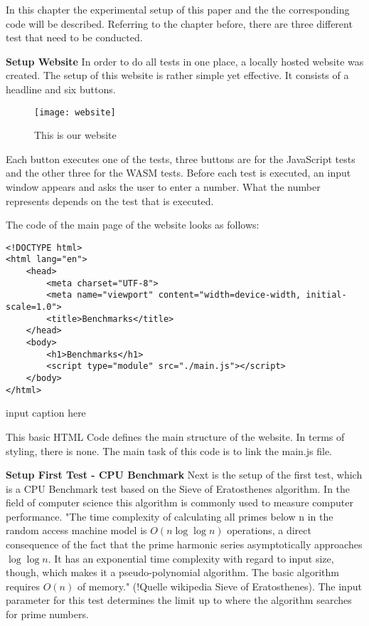 In this chapter the experimental setup of this paper and the the corresponding code will be described. Referring to the chapter before, there are three different test that need to be conducted. 

\textbf{Setup Website} \newline
In order to do all tests in one place, a locally hosted website was created. The setup of this website is rather simple yet effective. It consists of a headline and six buttons.
\begin{figure}[H]
    \centering
    \caption[]{This is our website}
	\label{fig:website}
    \texttt{[image: website]}
\end{figure}

Each button executes one of the tests, three buttons are for the JavaScript tests and the other three for the WASM tests. Before each test is executed, an input window appears and asks the user to enter a number. What the number represents depends on the test that is executed.

The code of the main page of the website looks as follows:
\begin{verbatim}
<!DOCTYPE html>
<html lang="en">
    <head>
        <meta charset="UTF-8">
        <meta name="viewport" content="width=device-width, initial-scale=1.0">
        <title>Benchmarks</title>
    </head>
    <body>
        <h1>Benchmarks</h1>
        <script type="module" src="./main.js"></script>
    </body>
</html>
\end{verbatim}
input caption here

This basic HTML Code defines the main structure of the website. In terms of styling, there is none. The main task of this code is to link the main.js file.  

\textbf{Setup First Test - CPU Benchmark} \newline
Next is the setup of the first test, which is a CPU Benchmark test based on the Sieve of Eratosthenes algorithm. In the field of computer science this algorithm is commonly used to measure computer performance. "The time complexity of calculating all primes below n in the random access machine model is \( O(n \log \log n) \) operations, a direct consequence of the fact that the prime harmonic series asymptotically approaches \( \log \log n\). It has an exponential time complexity with regard to input size, though, which makes it a pseudo-polynomial algorithm. The basic algorithm requires \( O(n) \) of memory." (!Quelle wikipedia Sieve of Eratosthenes).
The input parameter for this test determines the limit up to where the algorithm searches for prime numbers.

